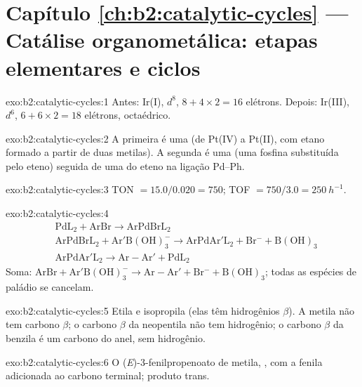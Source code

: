 \section*{Capítulo \ref{ch:b2:catalytic-cycles} --- Catálise organometálica: etapas elementares e ciclos}

\begin{solution}{exo:b2:catalytic-cycles:1}
Antes: Ir(I), $d^8$, $8 + 4 \times 2 = 16$ elétrons. Depois: Ir(III), $d^6$, $6 + 6 \times 2 = 18$
elétrons, octaédrico.
\end{solution}

\begin{solution}{exo:b2:catalytic-cycles:2}
A primeira é uma  (de Pt(IV) a Pt(II), com etano formado a
partir de duas metilas). A segunda é uma  (uma fosfina
substituída pelo eteno) seguida de uma  do eteno na
ligação Pd--Ph.
\end{solution}

\begin{solution}{exo:b2:catalytic-cycles:3}
TON $= 15.0/0.020 = 750$; TOF $= 750/3.0 = \qty{250}{h^{-1}}$.
\end{solution}

\begin{solution}{exo:b2:catalytic-cycles:4}
\begin{align*}
  &\mathrm{PdL_2 + ArBr \to ArPdBrL_2}\\
  &\mathrm{ArPdBrL_2 + Ar'B(OH)_3^- \to ArPdAr'L_2 + Br^- + B(OH)_3}\\
  &\mathrm{ArPdAr'L_2 \to Ar{-}Ar' + PdL_2}
\end{align*}
Soma: $\mathrm{ArBr + Ar'B(OH)_3^- \to Ar{-}Ar' + Br^- + B(OH)_3}$; todas as espécies de
paládio se cancelam.
\end{solution}

\begin{solution}{exo:b2:catalytic-cycles:5}
Etila e isopropila (elas têm hidrogênios $\beta$). A metila não tem carbono $\beta$;
o carbono $\beta$ da neopentila não tem hidrogênio; o carbono $\beta$ da benzila é um carbono
 do anel, sem hidrogênio.
\end{solution}

\begin{solution}{exo:b2:catalytic-cycles:6}
O (\textit{E})-3-fenilpropenoato de metila, , com a fenila
adicionada ao carbono terminal; produto trans.
\end{solution}

